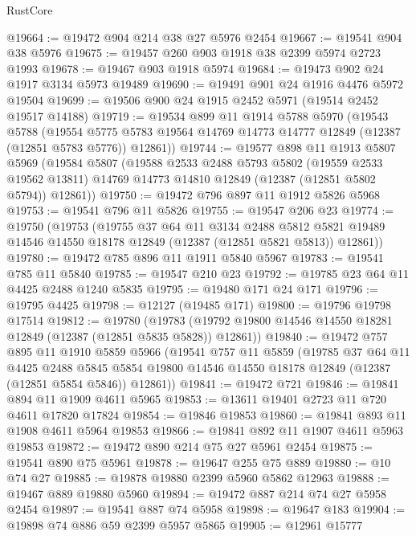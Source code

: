 \begin{lexlean}{RustCore}
\begin{coremodule}
@19664 := @19472 @904 @214 @38 @27 @5976 @2454
@19667 := @19541 @904 @38 @5976
@19675 := @19457 @260 @903 @1918 @38 @2399 @5974 @2723 @1993
@19678 := @19467 @903 @1918 @5974
@19684 := @19473 @902 @24 @1917 @3134 @5973 @19489
@19690 := @19491 @901 @24 @1916 @4476 @5972 @19504
@19699 := @19506 @900 @24 @1915 @2452 @5971 (@19514 @2452 @19517 @14188)
@19719 := @19534
    @899
    @11
    @1914
    @5788
    @5970
    (@19543
      @5788
      (@19554 @5775 @5783 @19564 @14769 @14773 @14777 @12849 (@12387 (@12851 @5783 @5776)) @12861))
@19744 := @19577
    @898
    @11
    @1913
    @5807
    @5969
    (@19584
      @5807
      (@19588
        @2533
        @2488
        @5793
        @5802
        (@19559 @2533 @19562 @13811)
        @14769
        @14773
        @14810
        @12849
        (@12387 (@12851 @5802 @5794))
        @12861))
@19750 := @19472 @796 @897 @11 @1912 @5826 @5968
@19753 := @19541 @796 @11 @5826
@19755 := @19547 @206 @23
@19774 := @19750
    (@19753
      (@19755
        @37
        @64
        @11
        @3134
        @2488
        @5812
        @5821
        @19489
        @14546
        @14550
        @18178
        @12849
        (@12387 (@12851 @5821 @5813))
        @12861))
@19780 := @19472 @785 @896 @11 @1911 @5840 @5967
@19783 := @19541 @785 @11 @5840
@19785 := @19547 @210 @23
@19792 := @19785 @23 @64 @11 @4425 @2488 @1240 @5835
@19795 := @19480 @171 @24 @171
@19796 := @19795 @4425
@19798 := @12127 (@19485 @171)
@19800 := @19796 @19798 @17514
@19812 := @19780
    (@19783 (@19792 @19800 @14546 @14550 @18281 @12849 (@12387 (@12851 @5835 @5828)) @12861))
@19840 := @19472
    @757
    @895
    @11
    @1910
    @5859
    @5966
    (@19541
      @757
      @11
      @5859
      (@19785
        @37
        @64
        @11
        @4425
        @2488
        @5845
        @5854
        @19800
        @14546
        @14550
        @18178
        @12849
        (@12387 (@12851 @5854 @5846))
        @12861))
@19841 := @19472 @721
@19846 := @19841 @894 @11 @1909 @4611 @5965
@19853 := @13611 @19401 @2723 @11 @720 @4611 @17820 @17824
@19854 := @19846 @19853
@19860 := @19841 @893 @11 @1908 @4611 @5964 @19853
@19866 := @19841 @892 @11 @1907 @4611 @5963 @19853
@19872 := @19472 @890 @214 @75 @27 @5961 @2454
@19875 := @19541 @890 @75 @5961
@19878 := @19647 @255 @75 @889
@19880 := @10 @74 @27
@19885 := @19878 @19880 @2399 @5960 @5862 @12963
@19888 := @19467 @889 @19880 @5960
@19894 := @19472 @887 @214 @74 @27 @5958 @2454
@19897 := @19541 @887 @74 @5958
@19898 := @19647 @183
@19904 := @19898 @74 @886 @59 @2399 @5957 @5865
@19905 := @12961 @15777

\end{coremodule}
\end{lexlean}
